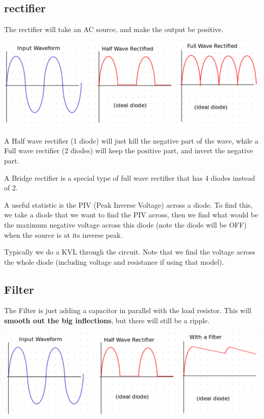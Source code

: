 \documentclass[12pt,letterpaper]{article} \usepackage{amsmath} \usepackage{graphicx} \usepackage[margin=1in]{geometry} \usepackage{longtable}  \usepackage{amssymb}
\begin{document}
	\subsection{rectifier}
	The rectifier will take an AC source, and make the output be positive.
	\begin{center}
		\includegraphics[width=0.9\linewidth]{rectifier}
	\end{center}
	
	
	A Half wave rectifier (1 diode) will just kill the negative part of the wave, while a Full wave rectifier (2 diodes) will keep the positive part, and invert the negative part. 
	
	A Bridge rectifier is a special type of full wave rectifier that has 4 diodes instead of 2. 
	
	A useful statistic is the PIV (Peak Inverse Voltage) across a diode. To find this, we take a diode that we want to find the PIV across, then we find what would be the maximum negative voltage across this diode (note the diode will be OFF) when the source is at its inverse peak. 
	
	Typically we do a KVL through the circuit. Note that we find the voltage across the whole diode (including voltage and resistance if using that model).
	
	
	\subsection{Filter}
	The Filter is just adding a capacitor in parallel with the load resistor. This will \textbf{smooth out the big inflections}, but there will still be a ripple. 
	\begin{center}
		\includegraphics[width=0.9\linewidth]{filter}
	\end{center}
\end{document}

